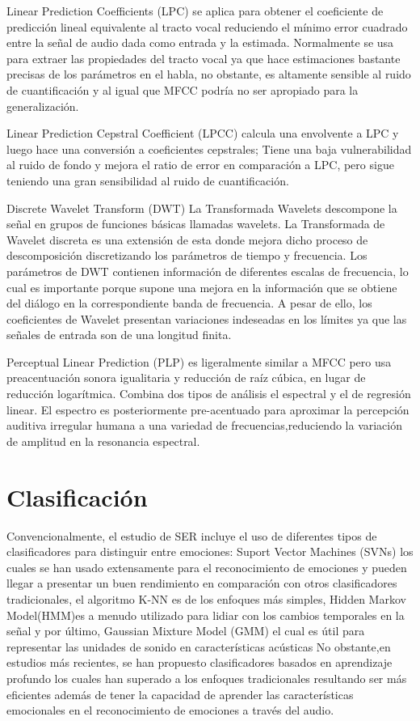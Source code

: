 \documentclass[11pt,a4paper,spanish]{book}
\begin{document}
	Linear Prediction Coefficients (LPC) se aplica para obtener el coeficiente de predicción lineal equivalente al tracto vocal reduciendo el mínimo error cuadrado entre la señal de audio dada como entrada y la estimada. Normalmente se usa para extraer las propiedades del tracto vocal ya que hace estimaciones bastante precisas de los parámetros en el habla, no obstante, es altamente sensible al ruido de cuantificación y al igual que MFCC podría no ser apropiado para la generalización.
	
	Linear Prediction Cepstral Coefficient (LPCC) calcula una envolvente a LPC y luego hace una conversión a coeficientes cepstrales; Tiene una baja vulnerabilidad al ruido de fondo y mejora el ratio de error en comparación a LPC, pero sigue teniendo una gran sensibilidad al ruido de cuantificación.
	
	Discrete Wavelet Transform (DWT) La Transformada Wavelets descompone la señal en grupos de funciones básicas llamadas wavelets. La Transformada de Wavelet discreta es una extensión de esta donde mejora dicho proceso de descomposición discretizando los parámetros de tiempo y frecuencia. Los parámetros de DWT contienen información de diferentes escalas de frecuencia, lo cual es importante porque supone una mejora en la información que se obtiene del diálogo en la correspondiente banda de frecuencia. A pesar de ello, los coeficientes de Wavelet presentan variaciones indeseadas en los límites ya que las señales de entrada son de una longitud finita.
	
	Perceptual Linear Prediction (PLP) es ligeralmente similar a MFCC pero usa preacentuación sonora igualitaria y reducción de raíz cúbica, en lugar de reducción logarítmica. Combina dos tipos de análisis el espectral y el de regresión linear. El espectro es posteriormente pre-acentuado para aproximar la percepción auditiva irregular humana a una variedad de frecuencias,reduciendo la variación de amplitud en la resonancia espectral.
	
	
	\section{Clasificación}
	Convencionalmente, el estudio de SER incluye el uso de diferentes tipos de clasificadores para distinguir entre emociones: Suport Vector Machines (SVNs) los cuales se han usado extensamente para el reconocimiento de emociones y pueden llegar a presentar un buen rendimiento en comparación con otros clasificadores tradicionales, el algoritmo K-NN es de los enfoques más simples, Hidden Markov Model(HMM)es a menudo utilizado para lidiar con los cambios temporales en la señal y por último, Gaussian Mixture Model (GMM) el cual es útil para representar las unidades de sonido en características acústicas %
	No obstante,en estudios más recientes, se han propuesto clasificadores basados en aprendizaje profundo los cuales han superado a los enfoques tradicionales resultando ser más eficientes además de tener la capacidad de aprender las características emocionales en el reconocimiento de emociones a través del audio.
	
\end{document}
